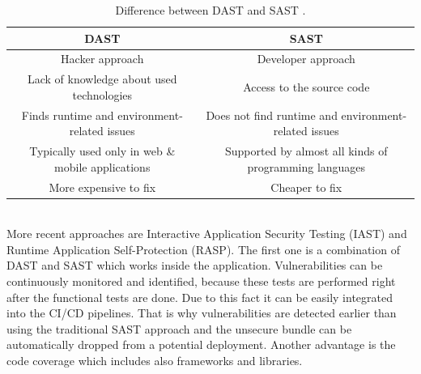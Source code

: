 \documentclass{article} %
\begin{document}
\begin{table}[ht]
\hspace*{-2cm}
\centering
    \begin{tabular}{ | c | c |}
    \hline\multicolumn{1}{|c|}{\textbf{DAST}\index{Software!testing!Dynamic Application Security Testing (DAST)}} & \multicolumn{1}{c|}{\textbf{SAST}\index{Software!testing!Static Application Security Testing (SAST)}} \\ \hline
    Hacker approach & Developer approach \\ \hline
    Lack of knowledge about used technologies & Access to the source code \\ \hline
    Finds runtime and environment-related issues  & Does not find runtime and environment-related issues \\ \hline
    Typically used only in web \& mobile applications & Supported by almost all kinds of programming languages \\ \hline
    More expensive to fix & Cheaper to fix \\ \hline
    \end{tabular}
\caption{Difference between DAST and SAST \cite{bib:dast_vs_sast}.}
\label{tab:sec_testing}
\hspace*{-2cm}
\end{table}\\
More recent approaches are Interactive Application Security Testing (IAST) and Runtime Application Self-Protection (RASP). The first one is a combination of DAST and SAST which works inside the application. Vulnerabilities can be continuously monitored and identified, because these tests are performed right after the functional tests are done. Due to this fact it can be easily integrated into the CI/CD pipelines. That is why vulnerabilities are detected earlier than using the traditional SAST approach and the unsecure bundle can be automatically dropped from a potential deployment. Another advantage is the code coverage which includes also frameworks and libraries.
\end{document}
